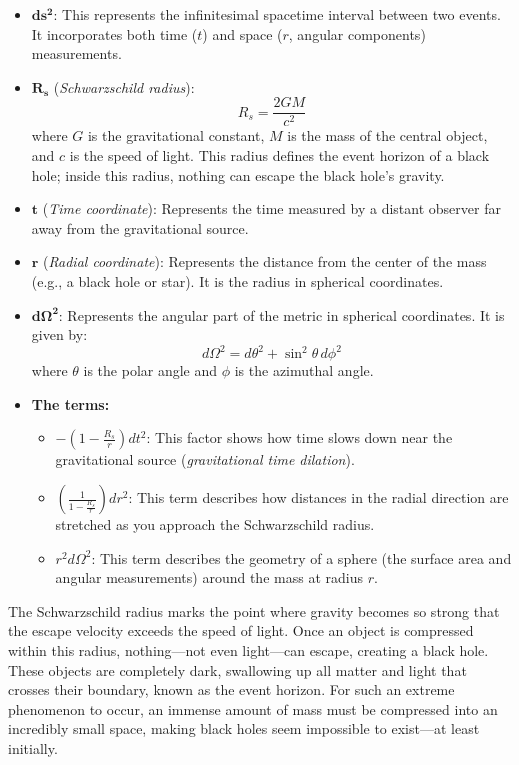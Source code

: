 \documentclass[12pt,a4paper]{article}
\begin{document}
\begin{itemize}
    \item \(\mathbf{ds^2}\): 
    This represents the infinitesimal spacetime interval between two events. It incorporates both time (\(t\)) and space (\(r\), angular components) measurements.
    
    \item \(\mathbf{R_s}\) (\textit{Schwarzschild radius}): 
    \[
    R_s = \frac{2GM}{c^2}
    \]
    where \(G\) is the gravitational constant, \(M\) is the mass of the central object, and \(c\) is the speed of light. This radius defines the event horizon of a black hole; inside this radius, nothing can escape the black hole's gravity.
    
    \item \(\mathbf{t}\) (\textit{Time coordinate}): 
    Represents the time measured by a distant observer far away from the gravitational source.
    
    \item \(\mathbf{r}\) (\textit{Radial coordinate}): 
    Represents the distance from the center of the mass (e.g., a black hole or star). It is the radius in spherical coordinates.
    
    \item \(\mathbf{d\Omega^2}\): 
    Represents the angular part of the metric in spherical coordinates. It is given by:
    \[
    d\Omega^2 = d\theta^2 + \sin^2\theta \, d\phi^2
    \]
    where \(\theta\) is the polar angle and \(\phi\) is the azimuthal angle.

    \item \textbf{The terms:}
    \begin{itemize}
        \item \(-\left(1 - \frac{R_s}{r}\right) dt^2\): This factor shows how time slows down near the gravitational source (\textit{gravitational time dilation}).
        \item \(\left(\frac{1}{1 - \frac{R_s}{r}}\right) dr^2\): This term describes how distances in the radial direction are stretched as you approach the Schwarzschild radius.
        \item \(r^2 d\Omega^2\): This term describes the geometry of a sphere (the surface area and angular measurements) around the mass at radius \(r\).
    \end{itemize}
\end{itemize}

The Schwarzschild radius marks the point where gravity becomes so strong that the escape velocity exceeds the speed of light. Once an object is compressed within this radius, nothing—not even light—can escape, creating a black hole. These objects are completely dark, swallowing up all matter and light that crosses their boundary, known as the event horizon. For such an extreme phenomenon to occur, an immense amount of mass must be compressed into an incredibly small space, making black holes seem impossible to exist—at least initially.
\end{document}
